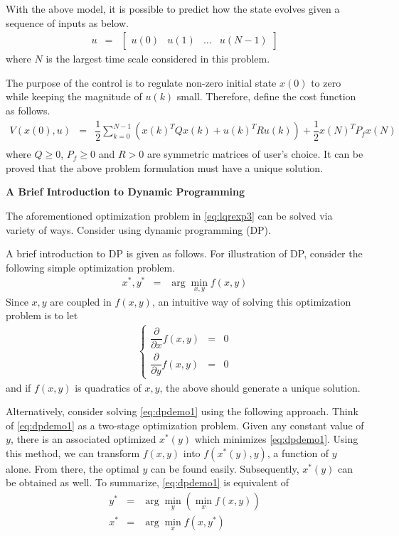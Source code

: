With the above model, it is possible to predict how the state evolves given a sequence of inputs as below.
\begin{eqnarray}
  u &=& \left[\begin{array}{cccc}
                u(0) & u(1) & \ldots & u(N-1) \nonumber
              \end{array}\right]
\end{eqnarray}
where $N$ is the largest time scale considered in this problem.

The purpose of the control is to regulate non-zero initial state $x(0)$ to zero while keeping the magnitude of $u(k)$ small. Therefore, define the cost function as follows.
\begin{eqnarray}
  V\left(x(0), u\right) &=& \dfrac{1}{2}\sum_{k=0}^{N-1}\left(x(k)^TQx(k) + u(k)^TRu(k)\right) + \dfrac{1}{2}x(N)^TP_fx(N) \nonumber \\ \label{eq:lqrexp3}
\end{eqnarray}
where $Q\geq 0$, $P_f \geq0$ and $R>0$ are symmetric matrices of user's choice. It can be proved that the above problem formulation must have a unique solution.

\vspace{0.1in}
\noindent \textbf{A Brief Introduction to Dynamic Programming}
\vspace{0.1in}

The aforementioned optimization problem in \eqref{eq:lqrexp3} can be solved via variety of ways. Consider using dynamic programming (DP). 

A brief introduction to DP is given as follows. For illustration of DP, consider the following simple optimization problem.
\begin{eqnarray}
  x^*, y^* &=& \arg\min_{x,y} f(x, y) \label{eq:dpdemo1}
\end{eqnarray}
Since $x,y$ are coupled in $f(x,y)$, an intuitive way of solving this optimization problem is to let
\begin{eqnarray}
\left\{\begin{array}{ccc}
         \dfrac{\partial}{\partial x}f(x,y) & = & 0 \\
         \dfrac{\partial}{\partial y}f(x,y) & = & 0
       \end{array}\right. \nonumber
\end{eqnarray}
and if $f(x,y)$ is quadratics of $x, y$, the above should generate a unique solution.

Alternatively, consider solving \eqref{eq:dpdemo1} using the following approach. Think of \eqref{eq:dpdemo1} as a two-stage optimization problem. Given any constant value of $y$, there is an associated optimized $x^*(y)$ which minimizes \eqref{eq:dpdemo1}. Using this method, we can transform $f(x,y)$ into $f\left(x^*(y), y\right)$, a function of $y$ alone. From there, the optimal $y$ can be found easily. Subsequently, $x^*(y)$ can be obtained as well. To summarize, \eqref{eq:dpdemo1} is equivalent of
\begin{eqnarray}
y^* &=& \arg\min_{y}\left(\min_{x}f(x,y)\right) \nonumber \\
x^* &=& \arg\min_{x} f(x, y^*) \nonumber
\end{eqnarray}

